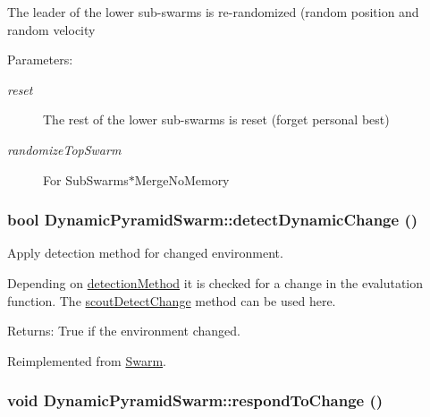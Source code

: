 The leader of the lower sub-swarms is re-randomized (random position and random velocity \begin{Desc}
\item[Parameters:]
\begin{description}
\item[{\em reset}]The rest of the lower sub-swarms is reset (forget personal best) \item[{\em randomizeTopSwarm}]For SubSwarms$\ast$MergeNoMemory \end{description}
\end{Desc}
\hypertarget{classDynamicPyramidSwarm_ae6437872484ff8baa443d3c2beee820}{
\subsubsection{\setlength{\rightskip}{0pt plus 5cm}bool DynamicPyramidSwarm::detectDynamicChange ()}}
\label{classDynamicPyramidSwarm_ae6437872484ff8baa443d3c2beee820}


Apply detection method for changed environment. 

Depending on \hyperlink{classSwarm_fccbdf32a0ea11cb33665d64ffb15c56}{detectionMethod} it is checked for a change in the evalutation function. The \hyperlink{pso_8h_ea087f59f65df7bbf4798bccd8a02416ebd06eaa1852db2ca2e4569c0a4aa7a1}{scoutDetectChange} method can be used here. \begin{Desc}
\item[Returns:]True if the environment changed. \end{Desc}


Reimplemented from \hyperlink{classSwarm_2ff0a2521e41d8b26e031e5a08c583b5}{Swarm}.\hypertarget{classDynamicPyramidSwarm_fbbb06914f9500603fee564415d976ae}{
\subsubsection{\setlength{\rightskip}{0pt plus 5cm}void DynamicPyramidSwarm::respondToChange ()}}
\label{classDynamicPyramidSwarm_fbbb06914f9500603fee564415d976ae}


